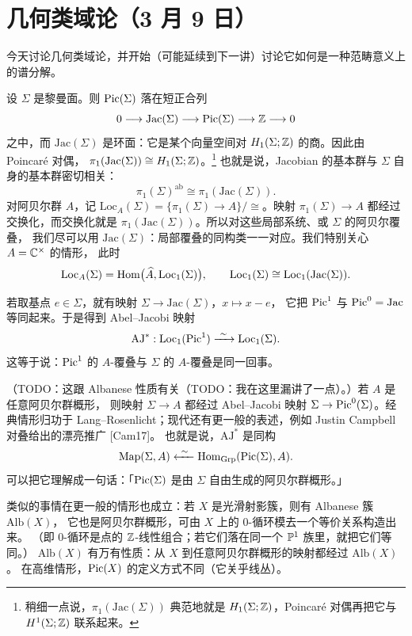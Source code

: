 \section[几何类域论]{几何类域论（3 月 9 日）}

今天讨论几何类域论，并开始（可能延续到下一讲）讨论它如何是一种范畴意义上的谱分解。

设 $\Sigma$ 是黎曼面。则 $\operatorname{Pic}(\Sigma)$ 落在短正合列
\[
0\longrightarrow \mathrm{Jac}(\Sigma)\longrightarrow \operatorname{Pic}(\Sigma)\longrightarrow \mathbb{Z}\longrightarrow 0
\]
之中，而 $\mathrm{Jac}(\Sigma)$ 是环面：它是某个向量空间对 $H_1(\Sigma;\mathbb{Z})$ 的商。因此由 Poincaré 对偶，
$\pi_1(\mathrm{Jac}(\Sigma))\cong H_1(\Sigma;\mathbb{Z})$。\footnote{稍细一点说，$\pi_1(\mathrm{Jac}(\Sigma))$
典范地就是 $H_1(\Sigma;\mathbb{Z})$，Poincaré 对偶再把它与 $H^1(\Sigma;\mathbb{Z})$ 联系起来。}
也就是说，Jacobian 的基本群与 $\Sigma$ 自身的基本群密切相关：
\[
\pi_1(\Sigma)^{\mathrm{ab}}\cong \pi_1(\mathrm{Jac}(\Sigma)).
\]
对阿贝尔群 $A$，记 $\mathrm{Loc}_A(\Sigma)=\{\pi_1(\Sigma)\to A\}/\cong$。映射 $\pi_1(\Sigma)\to A$
都经过交换化，而交换化就是 $\pi_1(\mathrm{Jac}(\Sigma))$。所以对这些局部系统、或 $\Sigma$ 的阿贝尔覆叠，
我们尽可以用 $\mathrm{Jac}(\Sigma)$：局部覆叠的同构类一一对应。我们特别关心 $A=\mathbb{C}^\times$ 的情形，
此时
\[
\mathrm{Loc}_A(\Sigma)=\operatorname{Hom}\bigl(\widehat{A},\mathrm{Loc}_1(\Sigma)\bigr),
\qquad \mathrm{Loc}_1(\Sigma)\cong \mathrm{Loc}_1(\mathrm{Jac}(\Sigma)).
\]

若取基点 $e\in\Sigma$，就有映射 $\Sigma\to\mathrm{Jac}(\Sigma)$，$x\mapsto x-e$，
它把 $\operatorname{Pic}^1$ 与 $\operatorname{Pic}^0=\mathrm{Jac}$ 等同起来。于是得到 Abel–Jacobi 映射
\[
\mathrm{AJ}^*:\mathrm{Loc}_1(\Pic^1)\xrightarrow{\ \sim\ }\mathrm{Loc}_1(\Sigma).
\]
这等于说：$\operatorname{Pic}^1$ 的 $A$-覆叠与 $\Sigma$ 的 $A$-覆叠是同一回事。

（TODO：这跟 Albanese 性质有关（TODO：我在这里漏讲了一点）。）若 $A$ 是任意阿贝尔群概形，
则映射 $\Sigma\to A$ 都经过 Abel–Jacobi 映射 $\Sigma\to\operatorname{Pic}^0(\Sigma)$。经典情形归功于
Lang–Rosenlicht；现代还有更一般的表述，例如 Justin Campbell 对叠给出的漂亮推广 [Cam17]。
也就是说，$\mathrm{AJ}^*$ 是同构
\[
\mathrm{Map}(\Sigma,A)\xleftarrow{\ \sim\ }\Hom_{\mathrm{Grp}}(\Pic(\Sigma),A).
\]
可以把它理解成一句话：「$\operatorname{Pic}(\Sigma)$ 是由 $\Sigma$ 自由生成的阿贝尔群概形。」

类似的事情在更一般的情形也成立：若 $X$ 是光滑射影簇，则有 Albanese 簇 $\mathrm{Alb}(X)$，
它也是阿贝尔群概形，可由 $X$ 上的 $0$-循环模去一个等价关系构造出来。
（即 $0$-循环是点的 $\mathbb{Z}$-线性组合；若它们落在同一个 $\mathbb{P}^1$ 族里，就把它们等同。）
$\mathrm{Alb}(X)$ 有万有性质：从 $X$ 到任意阿贝尔群概形的映射都经过 $\mathrm{Alb}(X)$。
在高维情形，$\operatorname{Pic}(X)$ 的定义方式不同（它关乎线丛）。

